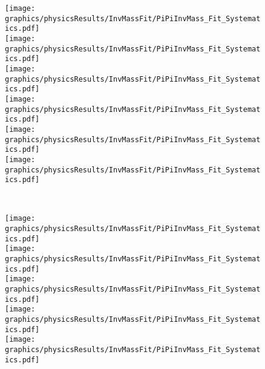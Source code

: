 \begin{figure}[hb]%
\ContinuedFloat
\centering
\parbox{0.495\textwidth}{
  \centering
  \texttt{[image: graphics/physicsResults/InvMassFit/PiPiInvMass\_Fit\_Systematics.pdf]}\\
  \texttt{[image: graphics/physicsResults/InvMassFit/PiPiInvMass\_Fit\_Systematics.pdf]}\\
  \texttt{[image: graphics/physicsResults/InvMassFit/PiPiInvMass\_Fit\_Systematics.pdf]}\\
  \texttt{[image: graphics/physicsResults/InvMassFit/PiPiInvMass\_Fit\_Systematics.pdf]}\\
  \texttt{[image: graphics/physicsResults/InvMassFit/PiPiInvMass\_Fit\_Systematics.pdf]}\\
  \texttt{[image: graphics/physicsResults/InvMassFit/PiPiInvMass\_Fit\_Systematics.pdf]}
}~
\parbox{0.495\textwidth}{
  \centering
  \texttt{[image: graphics/physicsResults/InvMassFit/PiPiInvMass\_Fit\_Systematics.pdf]}\\
  \texttt{[image: graphics/physicsResults/InvMassFit/PiPiInvMass\_Fit\_Systematics.pdf]}\\
  \texttt{[image: graphics/physicsResults/InvMassFit/PiPiInvMass\_Fit\_Systematics.pdf]}\\
  \texttt{[image: graphics/physicsResults/InvMassFit/PiPiInvMass\_Fit\_Systematics.pdf]}\\
  \texttt{[image: graphics/physicsResults/InvMassFit/PiPiInvMass\_Fit\_Systematics.pdf]}\\[103pt]
}%
\end{figure}%
